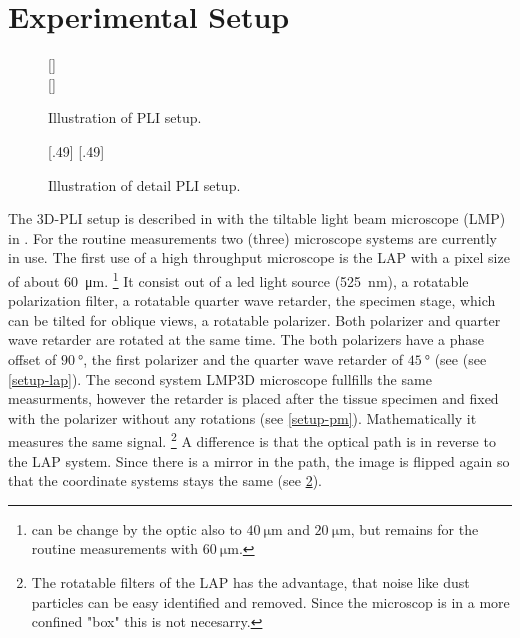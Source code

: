 \section{Experimental Setup}
%
\begin{figure}[!t]
    \captionsetup[sub]{position=top}
    \def\tikzwidth{\textwidth}
	\centering
	[\textwidth]{
	}\\
	[\textwidth]{
	}
	\caption{Illustration of PLI setup.}
	\label{fig:pli_setup}
\end{figure}
%
\begin{figure}[!t]
    \def\tikzwidth{0.49*\textwidth}
	\centering
	[.49\textwidth]{
			}\hfill
	[.49\textwidth]{
			}
	\caption{Illustration of detail PLI setup.}
	\label{fig:pli_detail}
\end{figure}
%
The \ac{3D-PLI} setup is described in \cite{Axer2011} with the tiltable light beam microscope (LMP) in \cite{Wiese:887678}.
For the routine measurements two (three) microscope systems are currently in use.
The first use of a high throughput microscope is the \ac{LAP} with a pixel size of about \SI{60}{\micro\meter}. \footnote{can be change by the optic also to $\SI{40}{\micro\meter}$ and $\SI{20}{\micro\meter}$, but remains for the routine measurements with $\SI{60}{\micro\meter}$.}
It consist out of a led light source (\SI{525}{\nano\meter}), a rotatable polarization filter, a rotatable quarter wave retarder, the specimen stage, which can be tilted for oblique views, a rotatable polarizer.
Both polarizer and quarter wave retarder are rotated at the same time.
The both polarizers have a phase offset of $\SI{90}{\degree}$, the first polarizer and the quarter wave retarder of $\SI{45}{\degree}$ (see (see \cref{setup-lap}).
The second system \ac{LMP3D} microscope fullfills the same measurments, however the retarder is placed after the tissue specimen and fixed with the polarizer without any rotations (see \cref{setup-pm}).
Mathematically it measures the same signal.
\footnote{The rotatable filters of the \ac{LAP} has the advantage, that noise like dust particles can be easy identified and removed. Since the microscop is in a more confined "box" this is not necesarry.}
A difference is that the optical path is in reverse to the \ac{LAP} system.
Since there is a mirror in the path, the image is flipped again so that the coordinate systems stays the same (see \cref{fig:pli_detail}).
% 
